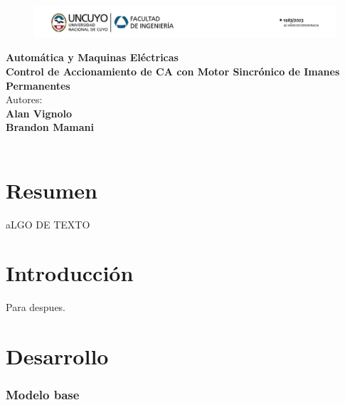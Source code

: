 \documentclass{article}
\begin{document}
\begin{titlepage}
    \centering
    \begin{figure}[H]
        \centering
        \includegraphics[width=1\textwidth]{encabezado.png}
    \end{figure}
    \vspace*{3cm}
    \huge{\textbf{Automática y Maquinas Eléctricas}}\\
    \vspace*{3cm}
    \Huge\textbf{Control de Accionamiento de CA con Motor Sincrónico de Imanes Permanentes}\\
    \vspace{8cm}
    \large{Autores:}\\
    \large{\textbf{Alan Vignolo\\Brandon Mamani}}\\
    \vfill
    \the\year\\ %
\end{titlepage}

\tableofcontents
{}

\newpage

\part*{Resumen}

aLGO DE TEXTO


\newpage

\part*{Introducción}

\lipsum[0]

Para despues.

\newpage

\part*{Desarrollo}


\section{Modelo base}
\end{document}
